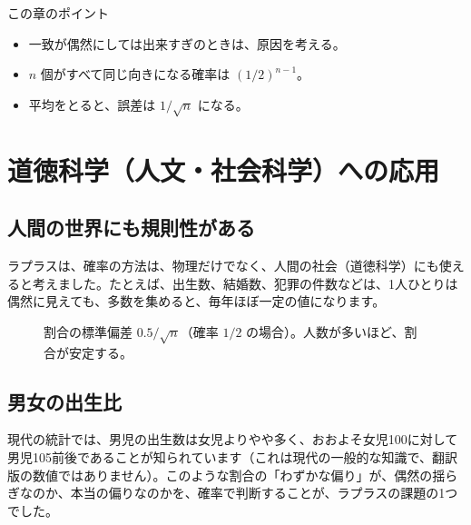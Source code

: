 \documentclass[a4paper,11pt,openany]{ltjsbook}
\begin{document}
\begin{pointbox}{この章のポイント}
\begin{itemize}[leftmargin=1.5em]
\item 一致が偶然にしては出来すぎのときは、原因を考える。
\item $n$ 個がすべて同じ向きになる確率は $(1/2)^{n-1}$。
\item 平均をとると、誤差は $1/\sqrt n$ になる。
\end{itemize}
\end{pointbox}

\chapter{道徳科学（人文・社会科学）への応用}

\section{人間の世界にも規則性がある}

ラプラスは、確率の方法は、物理だけでなく、人間の社会（道徳科学）にも使えると考えました。たとえば、出生数、結婚数、犯罪の件数などは、1人ひとりは偶然に見えても、多数を集めると、毎年ほぼ一定の値になります。

\begin{figure}[htbp]
\centering
{}
\caption{割合の標準偏差 $0.5/\sqrt n$（確率 $1/2$ の場合）。人数が多いほど、割合が安定する。}
\end{figure}

\section{男女の出生比}

現代の統計では、男児の出生数は女児よりやや多く、おおよそ女児100に対して男児105前後であることが知られています（これは現代の一般的な知識で、翻訳版の数値ではありません）。このような割合の「わずかな偏り」が、偶然の揺らぎなのか、本当の偏りなのかを、確率で判断することが、ラプラスの課題の1つでした。
\end{document}
